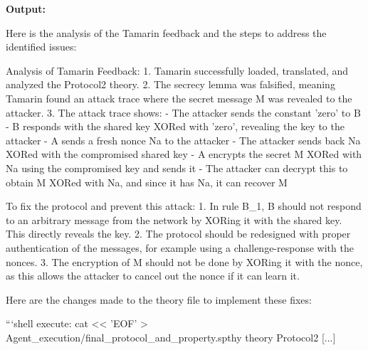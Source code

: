 \noindent \textbf{Output:}
\begin{spverbatim}
Here is the analysis of the Tamarin feedback and the steps to address the identified issues:

Analysis of Tamarin Feedback:
1. Tamarin successfully loaded, translated, and analyzed the Protocol2 theory. 
2. The secrecy lemma was falsified, meaning Tamarin found an attack trace where the secret message M was revealed to the attacker.
3. The attack trace shows:
   - The attacker sends the constant 'zero' to B
   - B responds with the shared key XORed with 'zero', revealing the key to the attacker 
   - A sends a fresh nonce Na to the attacker
   - The attacker sends back Na XORed with the compromised shared key
   - A encrypts the secret M XORed with Na using the compromised key and sends it
   - The attacker can decrypt this to obtain M XORed with Na, and since it has Na, it can recover M

To fix the protocol and prevent this attack:
1. In rule B_1, B should not respond to an arbitrary message from the network by XORing it with the shared key. This directly reveals the key.
2. The protocol should be redesigned with proper authentication of the messages, for example using a challenge-response with the nonces.
3. The encryption of M should not be done by XORing it with the nonce, as this allows the attacker to cancel out the nonce if it can learn it.

Here are the changes made to the theory file to implement these fixes:

```shell
execute: cat << 'EOF' > Agent_execution/final_protocol_and_property.spthy
theory Protocol2
[...]
\end{spverbatim}